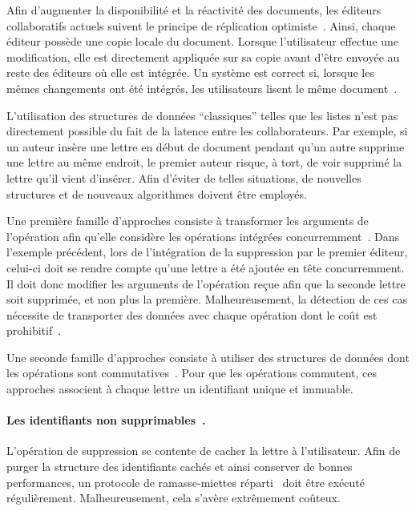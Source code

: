 Afin d'augmenter la disponibilité et la réactivité des documents, les éditeurs
collaboratifs actuels suivent le principe de réplication
optimiste~\cite{saito2005optimistic}. Ainsi, chaque éditeur possède une copie
locale du document. Lorsque l'utilisateur effectue une modification, elle est
directement appliquée sur sa copie avant d'être envoyée au reste des éditeurs où
elle est intégrée. Un système est correct si, lorsque les mêmes changements ont
été intégrés, les utilisateurs lisent le même
document~\cite{burckhardt2014replicated, shapiro2011conflict}.

L'utilisation des structures de données ``classiques'' telles que les listes
n'est pas directement possible du fait de la latence entre les
collaborateurs. Par exemple, si un auteur insère une lettre en début de document
pendant qu'un autre supprime une lettre au même endroit, le premier auteur
risque, à tort, de voir supprimé la lettre qu'il vient d'insérer. Afin d'éviter
de telles situations, de nouvelles structures et de nouveaux algorithmes doivent
être employés.

Une première famille d'approches consiste à transformer les arguments de
l'opération afin qu'elle considère les opérations intégrées
concurremment~\cite{sun1998operational}. Dans l'exemple précédent, lors de
l'intégration de la suppression par le premier éditeur, celui-ci doit se rendre
compte qu'une lettre a été ajoutée en tête concurremment. Il doit donc modifier
les arguments de l'opération reçue afin que la seconde lettre soit supprimée, et
non plus la première. Malheureusement, la détection de ces cas nécessite de
transporter des données avec chaque opération dont le coût est
prohibitif~\cite{sun2009contextbased}.

Une seconde famille d'approches consiste à utiliser des structures de données
dont les opérations sont commutatives~\cite{shapiro2011conflict}. Pour que les
opérations commutent, ces approches associent à chaque lettre un identifiant
unique et immuable.

\paragraph{Les identifiants non supprimables~\cite{oster2006data}.} L'opération
de suppression se contente de cacher la lettre à l'utilisateur. Afin de purger
la structure des identifiants cachés et ainsi conserver de bonnes performances,
un protocole de ramasse-miettes réparti~\cite{abdullahi1998garbage} doit être
exécuté régulièrement. Malheureusement, cela s'avère extrêmement coûteux.

